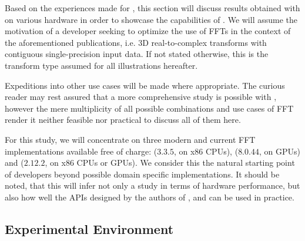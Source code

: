 Based on the experiences made for \cite{preibisch2014efficient, schmid2015real}, this section will discuss results obtained with \gearshifft{} on various hardware in order to showcase the capabilities of \gearshifft{}. We will assume the motivation of a developer seeking to optimize the use of FFTs in the context of the aforementioned publications, i.e. 3D real-to-complex transforms with contiguous single-precision input data. If not stated otherwise, this is the transform type assumed for all illustrations hereafter. 

Expeditions into other use cases will be made where appropriate. The curious reader may rest assured that a more comprehensive study is possible with \gearshifft{}, however the mere multiplicity of all possible combinations and use cases of FFT render it neither feasible nor practical to discuss all of them here.

For this study, we will concentrate on three modern and current FFT implementations available free of charge: \fftw{} ($3.3.5$, on x86 CPUs), \cufft{} ($8.0.44$, on \nvidia{} GPUs) and \clfft{} ($2.12.2$, on x86 CPUs or \nvidia{} GPUs). We consider this the natural starting point of developers beyond possible domain specific implementations. It should be noted, that this will infer not only a study in terms of hardware performance, but also how well the APIs designed by the authors of \fftw{}, \clfft{} and \cufft{} can be used in practice. 

\subsection{Experimental Environment}
\label{ssec:env}

